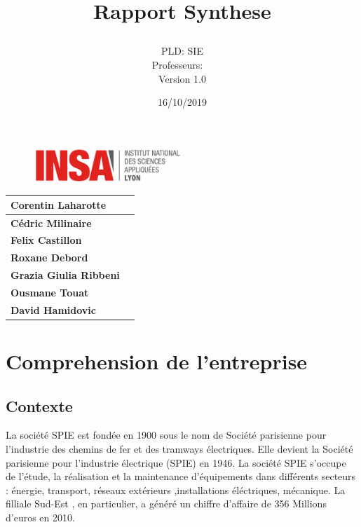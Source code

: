 \documentclass[]{scrartcl}
\title{Rapport Synthese\\
\subtitle{}
\author{PLD: SIE\\
Professeurs:\
\ \\
Version 1.0}
\date{16/10/2019}}
\begin{document}
\maketitle

\begin{figure}[h]
	\centering
  \includegraphics[width=0.5\textwidth]{img/insa-logo}
	\label{fig:logo}
\end{figure}


\begin{center}
  \begin{tabular}{ | l | r | }
    \hline
    \textbf{Corentin Laharotte}\\ \hline
    \textbf{Cédric Milinaire }\\ \hline
    \textbf{Felix Castillon}\\ \hline
    \textbf{Roxane Debord}\\ \hline
     \textbf{Grazia Giulia Ribbeni}\\ \hline
     \textbf{Ousmane Touat} \\ \hline
     \textbf{David Hamidovic} \\ \hline


  \end{tabular}
\end{center}

\thispagestyle{empty}
\pagebreak
\vspace*{10pt}
\tableofcontents
\listoffigures
\newpage

\section{Comprehension de l'entreprise}
\subsection{Contexte}
La société SPIE est fondée en 1900 sous le nom de Société parisienne pour l'industrie des chemins de fer et des tramways électriques. Elle devient la Société parisienne pour l'industrie électrique  (SPIE) en 1946. La société SPIE s'occupe de l'étude, la réalisation et la maintenance d'équipements dans différents secteurs : énergie, transport, réseaux extérieurs ,installations éléctriques, mécanique. La filliale Sud-Est , en particulier, a généré un chiffre d'affaire de 356 Millions d'euros en 2010.
\end{document}
